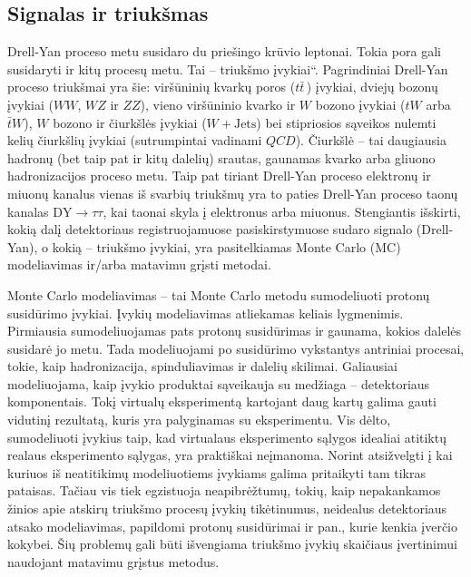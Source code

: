\documentclass[a4paper, 12pt, oneside]{article}
\newcommand{\WJets}{W\! +\!\mathrm{Jets}}
\newcommand{\DYtau}{\mathrm{DY} \! \rightarrow \! \tau\tau}
\newcommand{\ltq}[1]{{\quotedblbase{}#1\textquotedblleft{}}}
\newcommand{\QCD}{QC\! D}
\newlength\q
\begin{document}
\subsection{Signalas ir triukšmas}

Drell-Yan proceso metu susidaro du priešingo krūvio leptonai.
Tokia pora gali susidaryti ir kitų procesų metu.
Tai -- \ltq{triukšmo įvykiai}.
Pagrindiniai Drell-Yan proceso triukšmai yra šie: viršūninių kvarkų poros ($t\bar{t}\,$) įvykiai, dviejų bozonų
įvykiai ($WW$, $WZ$ ir $ZZ$), vieno viršūninio kvarko ir $W$ bozono įvykiai ($tW$ arba $\bar{t}W$), $W$ bozono
ir čiurkšlės įvykiai ($\WJets$) bei stipriosios sąveikos nulemti kelių čiurkšlių įvykiai (sutrumpintai vadinami $\QCD$).
Čiurkšlė -- tai daugiausia hadronų (bet taip pat ir kitų dalelių) srautas, gaunamas kvarko arba gliuono hadronizacijos
proceso metu.
Taip pat tiriant Drell-Yan proceso elektronų ir miuonų kanalus vienas iš svarbių triukšmų yra
to paties Drell-Yan proceso taonų kanalas $\DYtau$, kai taonai skyla į elektronus arba miuonus.
Stengiantis išskirti, kokią dalį detektoriaus registruojamuose pasiskirstymuose sudaro signalo (Drell-Yan),
o kokią -- triukšmo įvykiai, yra pasitelkiamas Monte Carlo (MC) modeliavimas ir/arba matavimu grįsti metodai.

Monte Carlo modeliavimas -- tai Monte Carlo metodu sumodeliuoti protonų susidūrimo įvykiai.
Įvykių modeliavimas atliekamas keliais lygmenimis.
Pirmiausia sumodeliuojamas pats protonų susidūrimas ir gaunama, kokios dalelės susidarė jo metu.
Tada modeliuojami po susidūrimo vykstantys antriniai procesai, tokie, kaip hadronizacija, spinduliavimas ir dalelių skilimai.
Galiausiai modeliuojama, kaip įvykio produktai sąveikauja su medžiaga -- detektoriaus komponentais.
Tokį virtualų eksperimentą kartojant daug kartų galima gauti vidutinį rezultatą, kuris yra palyginamas su eksperimentu.
Vis dėlto, sumodeliuoti įvykius taip, kad virtualaus eksperimento sąlygos idealiai atitiktų realaus eksperimento sąlygas,
yra praktiškai neįmanoma.
Norint atsižvelgti į kai kuriuos iš neatitikimų modeliuotiems įvykiams galima pritaikyti tam tikras pataisas.
Tačiau vis tiek egzistuoja neapibrėžtumų, tokių, kaip nepakankamos žinios apie atskirų triukšmo procesų įvykių tikėtinumus,
neidealus detektoriaus atsako modeliavimas, papildomi protonų susidūrimai ir pan., kurie kenkia įverčio kokybei.
Šių problemų gali būti išvengiama triukšmo įvykių skaičiaus įvertinimui naudojant matavimu grįstus metodus.
\end{document}
